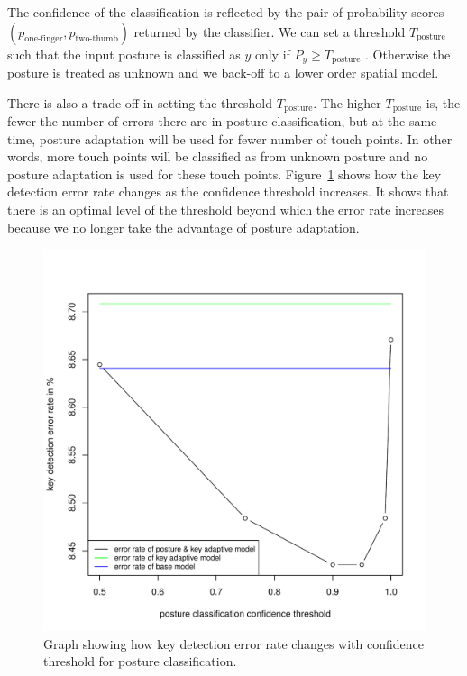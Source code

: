 \documentclass{sigchi}
\begin{document}
The confidence of the classification is reflected by the pair of probability 
scores $(p_{\text{one-finger}}, p_{\text{two-thumb}})$ returned by the classifier. 
We can set a threshold $T_{\text{posture}}$ such that the input posture is classified
as $y$ only if $P_y \ge T_{\text{posture}}$ . Otherwise the posture is treated as
unknown and we back-off to a lower order spatial model.

There is also a trade-off in setting the threshold $T_{\text{posture}}$. The higher
 $T_{\text{posture}}$ is, the fewer the number of errors there are in posture classification, but at the same time,
 posture adaptation will be used for fewer number of touch points. In other words, 
 more touch points will be classified as from unknown posture and no posture adaptation 
 is used for these touch points. Figure~\ref{fig:posture-confidence} shows how
 the key detection error rate changes as the confidence threshold increases. It 
 shows that there is an optimal level of the threshold beyond which the error rate
 increases because we no longer take the advantage of posture adaptation.

\begin{figure}[tb]
 \includegraphics[width=0.9\columnwidth]{figures/error-confidence.pdf}
  \caption{Graph showing how key detection error rate changes with confidence
  threshold for posture classification.}
  \label{fig:posture-confidence}
\end{figure}
\end{document}
